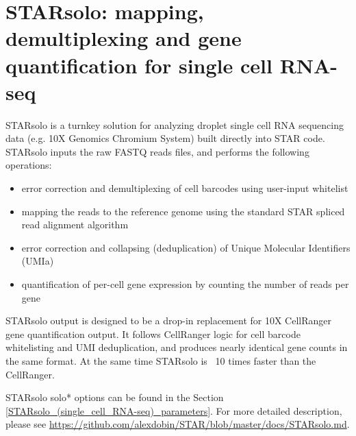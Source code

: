 \documentclass[12pt]{article}
\begin{document}
\section{STARsolo: mapping, demultiplexing and gene quantification for single cell RNA-seq}

STARsolo is a turnkey solution for analyzing droplet single cell RNA sequencing data (e.g. 10X Genomics Chromium System) built directly into STAR code.
STARsolo inputs the raw FASTQ reads files, and performs the following operations:
\begin{itemize}
	\itemsep -0.5em
	\item
	error correction and demultiplexing of cell barcodes using user-input whitelist
	\item
	mapping the reads to the reference genome using the standard STAR spliced read alignment algorithm
	\item
	error correction and collapsing (deduplication) of Unique Molecular Identifiers (UMIa)
	\item
	quantification of per-cell gene expression by counting the number of reads per gene
\end{itemize}
STARsolo output is designed to be a drop-in replacement for 10X CellRanger gene quantification output.
It follows CellRanger logic for cell barcode whitelisting and UMI deduplication, and produces nearly identical gene counts in the same format. At the same time STARsolo is ~10 times faster than the CellRanger.

STARsolo solo* options can be found in the Section \ref{STARsolo_(single_cell_RNA-seq)_parameters}.
For more detailed description, please see \url{https://github.com/alexdobin/STAR/blob/master/docs/STARsolo.md}.
\end{document}
